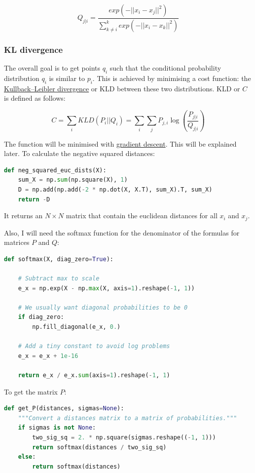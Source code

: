 $$ Q_{j|i}=\frac{exp(-||x_i - x_j||^2)}{\sum_{k\neq i}^kexp(-||x_i - x_k||^2)} $$

\subsubsection{KL divergence}
The overall goal is to get points $q_i$ such that the conditional probability distribution $q_i$ is similar to $p_i$. This is achieved by minimising a cost function: the \hyperlink{https://en.wikipedia.org/wiki/Kullback-Leibler_divergence}{Kullback–Leibler divergence} or KLD between these two distributions. KLD or $C$ is defined as follows:

$$ C = \sum_i KLD(P_i||Q_i) = \sum_i \sum_j P_{j,i} \log(\frac{P_{j|i}}{Q_{j|i}}) $$

The function will be minimised with \hyperlink{https://en.wikipedia.org/wiki/Gradient_descent}{gradient descent}. This will be explained later. To calculate the negative squared distances:
\begin{lstlisting}[language=Python]
def neg_squared_euc_dists(X):
    sum_X = np.sum(np.square(X), 1)
    D = np.add(np.add(-2 * np.dot(X, X.T), sum_X).T, sum_X)
    return -D
\end{lstlisting}

It returns an $N\times N$ matrix that contain the euclidean distances for all $x_i$ and $x_j$.

Also, I will need the softmax function for the denominator of the formulas for matrices $P$ and $Q$:
\begin{lstlisting}[language=Python]
def softmax(X, diag_zero=True):

    # Subtract max to scale
    e_x = np.exp(X - np.max(X, axis=1).reshape(-1, 1))

    # We usually want diagonal probabilities to be 0
    if diag_zero:
        np.fill_diagonal(e_x, 0.)

    # Add a tiny constant to avoid log problems
    e_x = e_x + 1e-16

    return e_x / e_x.sum(axis=1).reshape(-1, 1)
\end{lstlisting}

To get the matrix $P$:
\begin{lstlisting}[language=Python]
def get_P(distances, sigmas=None):
    """Convert a distances matrix to a matrix of probabilities."""
    if sigmas is not None:
        two_sig_sq = 2. * np.square(sigmas.reshape((-1, 1)))
        return softmax(distances / two_sig_sq)
    else:
        return softmax(distances)
\end{lstlisting}

